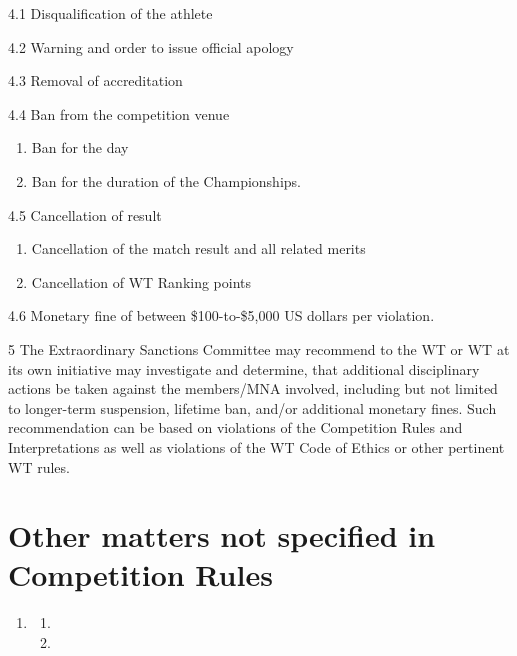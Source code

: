 \documentclass[draft]{report}
\renewcommand{\labelenumi}{\arabic{enumi}}
\begin{document}
4.1 Disqualification of the athlete

4.2 Warning and order to issue official apology

4.3 Removal of accreditation

4.4 Ban from the competition venue

\begin{enumerate}
\def\labelenumi{\roman{enumi})}
\item
  Ban for the day
\item
  Ban for the duration of the Championships.
\end{enumerate}

4.5 Cancellation of result

\begin{enumerate}
\def\labelenumi{\roman{enumi})}
\item
  Cancellation of the match result and all related merits
\item
  Cancellation of WT Ranking points
\end{enumerate}

4.6 Monetary fine of between \$100-to-\$5,000 US dollars per violation.

5 The Extraordinary Sanctions Committee may recommend to the WT or WT at
its own initiative may investigate and determine, that additional
disciplinary actions be taken against the members/MNA involved,
including but not limited to longer-term suspension, lifetime ban,
and/or additional monetary fines. Such recommendation can be based on
violations of the Competition Rules and Interpretations as well as
violations of the WT Code of Ethics or other pertinent WT rules.

\chapter{Other matters not specified in Competition Rules}\label{other}

\begin{enumerate}
\item

    \begin{enumerate}
    \item
    
    \item
    
    \end{enumerate}
\end{enumerate}
\end{document}
